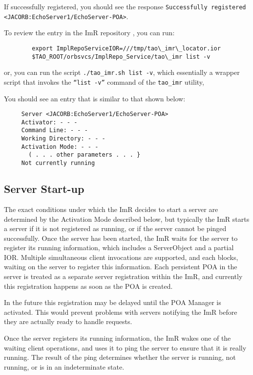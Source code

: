 If successfully registered, you should see the response
{\tt Successfully registered <JACORB:EchoServer1/EchoServer-POA>}.

To review the entry in the ImR repository , you can run:

\begin{verbatim}
        export ImplRepoServiceIOR=///tmp/tao\_imr\_locator.ior
        $TAO_ROOT/orbsvcs/ImplRepo_Service/tao\_imr list -v
\end{verbatim}

or, you can run the script {\tt ./tao\_imr.sh list -v}, which essentially
a wrapper script that invokes the {\tt “list -v”} command of the
{\tt tao\_imr} utility,

You should see an entry that is similar to that shown below:

\small{
\begin{verbatim}
     Server <JACORB:EchoServer1/EchoServer-POA>
     Activator: - - -
     Command Line: - - -
     Working Directory: - - -
     Activation Mode: - - -
       ( . . . other parameters . . . }
     Not currently running
\end{verbatim}
}

\subsection{Server Start-up}

The exact conditions under which the ImR decides to start a server are
determined by the Activation Mode described below, but typically the
ImR starts a server if it is not registered as running, or if the server cannot
be pinged successfully. Once the server has been started, the ImR waits
for the server to register its running information, which includes a
ServerObject and a partial IOR. Multiple simultaneous client invocations
are supported, and each blocks, waiting on the server to register this
information. Each persistent POA in the server is treated as a separate
server registration within the ImR, and currently this registration happens
as soon as the POA is created.

In the future this registration may be delayed until the POA Manager
is activated. This would prevent problems with servers notifying the ImR
before they are actually ready to handle requests.

Once the server registers its running information, the ImR wakes one of
the waiting client operations, and uses it to ping the server to ensure that
it is really running. The result of the ping determines whether the server
is running, not running, or is in an indeterminate state.


